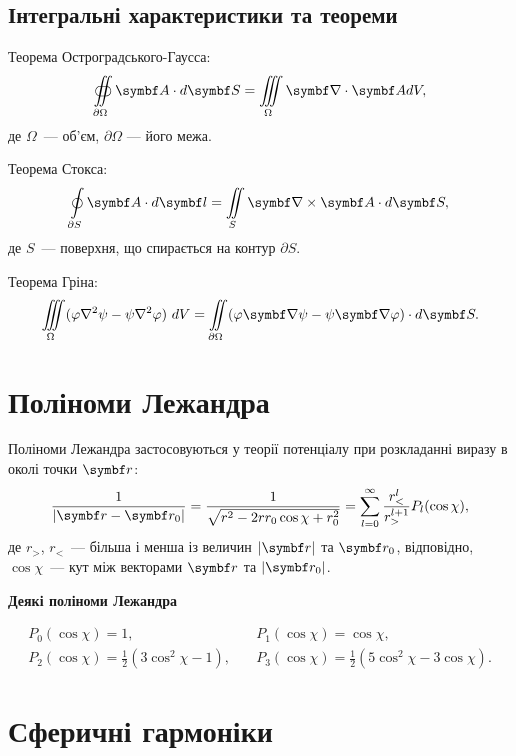 \subsection{Інтегральні характеристики та теореми}

Теорема Остроградського-Гаусса:
\begin{equation}\label{OGTheorem}
	\oiint\limits_{\partial \Omega} \vect{A}\cdot d\vect{S} = \iiint\limits_{\Omega} \divg\vect{A} dV,
\end{equation}
де $\Omega$~--- об'єм, $\partial\Omega$ --- його межа.

Теорема Стокса:
\begin{equation}\label{Stoksheorem}
	\oint\limits_{\partial S} \vect{A}\cdot d\vect{l} = \iint\limits_S \rot\vect{A} \cdot d\vect{S},
\end{equation}
де $S$~--- поверхня, що спирається на контур $\partial S$.

Теорема Гріна:
\begin{equation}\label{Grin}
	\iiint\limits_{\Omega}(\phi \nabla ^{2}\psi -\psi \nabla ^{2}\phi )\ dV=\iint \limits_{\partial \Omega}(\phi \vect{\nabla} \psi -\psi \vect{\nabla}
	\phi )\cdot d\vect{S}.
\end{equation}


\section{Поліноми Лежандра}\label{Polinoms}

Поліноми Лежандра застосовуються у теорії потенціалу при розкладанні виразу в околі точки $\vect{r}$:
\begin{equation*}\label{}
    \frac{1}{|\vect{r} - \vect{r}_0|} = \frac{1}{\sqrt{r^2 - 2rr_0 \cos\chi + r_0^2 }}  =  \sum\limits_{l = 0}^{\infty} \frac{r^l_<}{r^{l+1}_>} P_l(\cos\chi),
\end{equation*}
де $r_>$, $r_<$~--- більша і менша із величин $|\vect{r}|$ та $\vect{r}_0$, відповідно, $\cos\chi$~--- кут між векторами $\vect{r}$ та $|\vect{r}_0|$.

\medskip%
\textbf{Деякі поліноми Лежандра}

\begin{align*}
P_{0}(\cos\chi)  = 1, &\quad P_{1}(\cos\chi)  = \cos\chi, \\
P_{2}(\cos\chi)  = \frac {1}{2}(3\cos^2\chi-1), &\quad P_{3}(\cos\chi)  = \frac {1}{2}(5\cos^2\chi-3\cos\chi).
\end{align*}


\section{Сферичні гармоніки}\label{Spherical_Harmonics}

